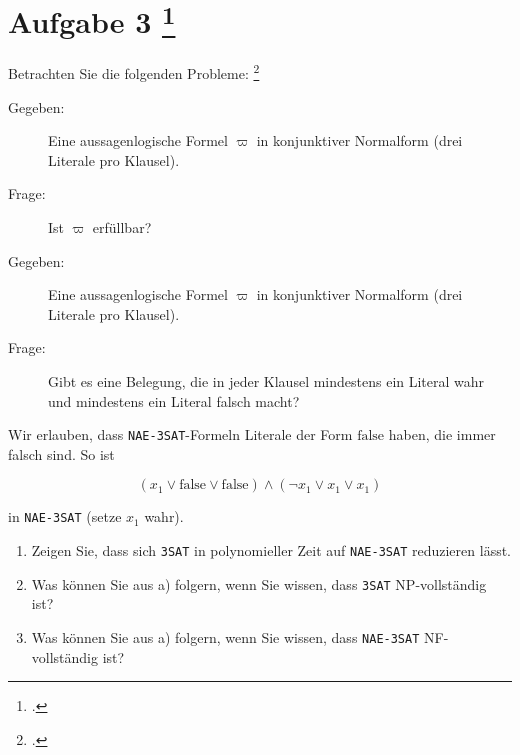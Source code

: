 \documentclass{lehramt-informatik-aufgabe}
\begin{document}
\liAufgabenTitel{}
\section{Aufgabe 3
\footcite{66115:2017:09}}


Betrachten Sie die folgenden Probleme:
\footcite[StEx F2016 T2 A3, StEx H2017 T1 A3 (Check-Up), Aufgabe 15]{theo:ab:4}

%


\begin{description}
\item[Gegeben:]

Eine aussagenlogische Formel $\varpi$ in konjunktiver Normalform (drei
Literale pro Klausel).

\item[Frage:]

Ist $\varpi$ erfüllbar?
\end{description}

%


\begin{description}
\item[Gegeben:]

Eine aussagenlogische Formel $\varpi$ in konjunktiver Normalform
(drei Literale pro Klausel).

\item[Frage:]

Gibt es eine Belegung, die in jeder Klausel mindestens ein Literal wahr
und mindestens ein Literal falsch macht?

\end{description}

Wir erlauben, dass \texttt{NAE-3SAT}-Formeln Literale der Form
$\text{false}$ haben, die immer falsch sind. So ist

\begin{displaymath}
(x_1 \lor \text{false} \lor \text{false})
\land
(\neg x_1 \lor x_1 \lor x_1)
\end{displaymath}

in \texttt{NAE-3SAT} (setze $x_1$ wahr).
\begin{enumerate}


\item Zeigen Sie, dass sich \texttt{3SAT} in polynomieller Zeit auf
\texttt{NAE-3SAT} reduzieren lässt.


\item Was können Sie aus a) folgern, wenn Sie wissen, dass \texttt{3SAT}
NP-vollständig ist?


\item Was können Sie aus a) folgern, wenn Sie wissen, dass
\texttt{NAE-3SAT} NF-vollständig ist?

\end{enumerate}
\end{document}
